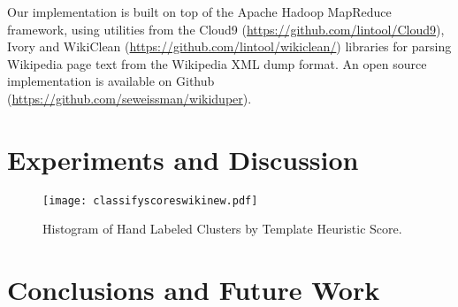 \documentclass{acm_proc_article-sp}
\begin{document}
Our implementation is built on top of the Apache Hadoop MapReduce framework, using utilities from the Cloud9 (\url{https://github.com/lintool/Cloud9}), Ivory  and WikiClean (\url{https://github.com/lintool/wikiclean/}) libraries for parsing Wikipedia page text from the Wikipedia XML dump format. An open source implementation is available on Github (\url{https://github.com/seweissman/wikiduper}).

\section{Experiments and Discussion}



\begin{figure}
\centering
\texttt{[image: classifyscoreswikinew.pdf]}
\caption{Histogram of Hand Labeled Clusters by Template Heuristic Score.}
\label{heuristic}
\end{figure}


\section{Conclusions and Future Work}



\balancecolumns
\end{document}
